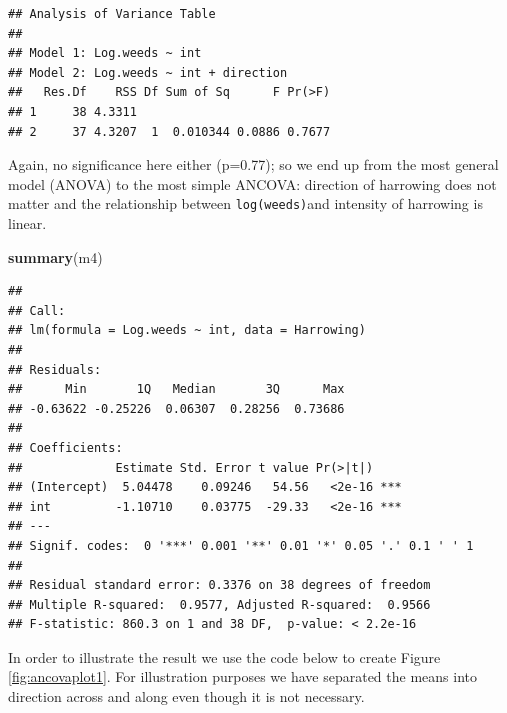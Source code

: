 \documentclass[letterpaper,]{book}
\newenvironment{Shaded}{\begin{snugshade}}{\end{snugshade}}
\newcommand{\KeywordTok}[1]{\textcolor[rgb]{0.13,0.29,0.53}{\textbf{#1}}}
\newcommand{\NormalTok}[1]{#1}
\begin{document}
\begin{verbatim}
## Analysis of Variance Table
## 
## Model 1: Log.weeds ~ int
## Model 2: Log.weeds ~ int + direction
##   Res.Df    RSS Df Sum of Sq      F Pr(>F)
## 1     38 4.3311                           
## 2     37 4.3207  1  0.010344 0.0886 0.7677
\end{verbatim}

Again, no significance here either (p=0.77); so we end up from the most general model (ANOVA) to the most simple ANCOVA: direction of harrowing does not matter and the relationship between \texttt{log(weeds)}and intensity of harrowing is linear.

\begin{Shaded}
\begin{Highlighting}[]
\KeywordTok{summary}\NormalTok{(m4)}
\end{Highlighting}
\end{Shaded}

\begin{verbatim}
## 
## Call:
## lm(formula = Log.weeds ~ int, data = Harrowing)
## 
## Residuals:
##      Min       1Q   Median       3Q      Max 
## -0.63622 -0.25226  0.06307  0.28256  0.73686 
## 
## Coefficients:
##             Estimate Std. Error t value Pr(>|t|)    
## (Intercept)  5.04478    0.09246   54.56   <2e-16 ***
## int         -1.10710    0.03775  -29.33   <2e-16 ***
## ---
## Signif. codes:  0 '***' 0.001 '**' 0.01 '*' 0.05 '.' 0.1 ' ' 1
## 
## Residual standard error: 0.3376 on 38 degrees of freedom
## Multiple R-squared:  0.9577, Adjusted R-squared:  0.9566 
## F-statistic: 860.3 on 1 and 38 DF,  p-value: < 2.2e-16
\end{verbatim}

In order to illustrate the result we use the code below to create Figure \ref{fig:ancovaplot1}. For illustration purposes we have separated the means into direction across and along even though it is not necessary.
\end{document}
